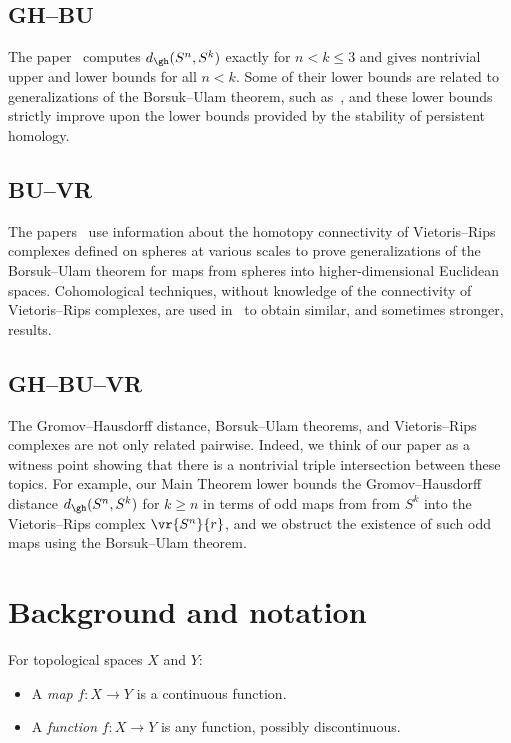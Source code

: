 \documentclass[11pt, reqno, english]{amsart}
\begin{document}
\subsection*{GH--BU}

The paper~\cite{lim2021gromov} computes $d_{\gh}(S^n,S^k)$ exactly for $n < k\le 3$ and gives nontrivial upper and lower bounds for all $n < k$.
Some of their lower bounds are related to generalizations of the Borsuk--Ulam theorem, such as~\cite{dubins1981equidiscontinuity}, and these lower bounds strictly improve upon the lower bounds provided by the stability of persistent homology.


\subsection*{BU--VR}

The papers~\cite{ABF,ABF2} use information about the homotopy connectivity of Vietoris--Rips complexes defined on spheres at various scales to prove generalizations of the Borsuk--Ulam theorem for maps from spheres into higher-dimensional Euclidean spaces.
Cohomological techniques, without knowledge of the connectivity of Vietoris--Rips complexes, are used in~\cite{crabb2021borsuk} to obtain similar, and sometimes stronger, results.


\subsection*{GH--BU--VR}

The Gromov--Hausdorff distance, Borsuk--Ulam theorems, and Vietoris--Rips complexes are not only related pairwise.
Indeed, we think of our paper as a witness point showing that there is a nontrivial triple intersection between these topics.
For example, our Main Theorem lower bounds the Gromov--Hausdorff distance $d_{\gh}(S^n,S^k)$ for $k\ge n$ in terms of odd maps from from $S^k$ into the Vietoris--Rips complex $\vr{S^n}{r}$, and we obstruct the existence of such odd maps using the Borsuk--Ulam theorem.



\section{Background and notation}\label{sec:background}

For topological spaces $X$ and $Y$:
\begin{itemize}
\item
A \emph{map} $f \colon X \to Y$ is a continuous function.
\item
A \emph{function} $f \colon X \to Y$ is any function, possibly discontinuous.
\end{itemize}
\end{document}
